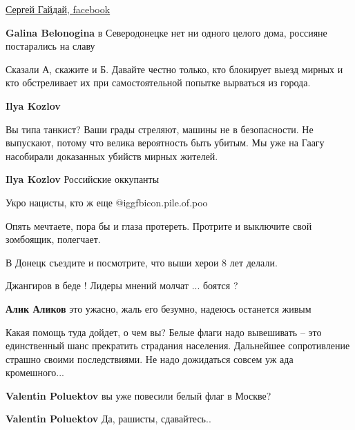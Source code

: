 \begin{itemize}
\begin{itemize}
\href{https://www.facebook.com/profile.php?id=100000695401534}{%
Сергей Гайдай, facebook}

\textbf{Galina Belonogina} в Северодонецке нет ни одного целого дома, россияне постарались на славу

\end{itemize} %


Сказали А, скажите и Б. Давайте честно только, кто блокирует выезд мирных и кто
обстреливает их при самостоятельной попытке вырваться из города.

\begin{itemize} %
\textbf{Ilya Kozlov} 

Вы типа танкист? Ваши грады стреляют, машины не в безопасности. Не выпускают,
потому что велика вероятность быть убитым. Мы уже на Гаагу насобирали
доказанных убийств мирных жителей.

\textbf{Ilya Kozlov} Российские оккупанты

Укро нацисты, кто ж еще @igg{fbicon.pile.of.poo} 

Опять мечтаете, пора бы и глаза протереть. Протрите и выключите свой зомбоящик, полегчает.

В Донецк съездите и посмотрите, что выши херои 8 лет делали.
\end{itemize} %

Джангиров в беде ! Лидеры мнений молчат ... боятся ?

\textbf{Алик Аликов} это ужасно, жаль его безумно, надеюсь останется живым


Какая помощь туда дойдет, о чем вы? Белые флаги надо вывешивать – это
единственный шанс прекратить страдания населения. Дальнейшее сопротивление
страшно своими последствиями. Не надо дожидаться совсем уж ада кромешного...

\begin{itemize} %
\textbf{Valentin Poluektov} вы уже повесили белый флаг в Москве?

\textbf{Valentin Poluektov} Да, рашисты, сдавайтесь..
\end{itemize} %

\end{itemize} %
